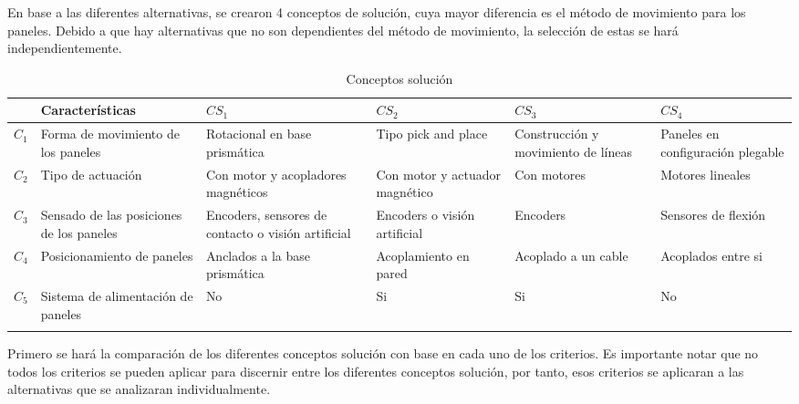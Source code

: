 \begin{center}
\begin{longtable}[!htb]
    \caption{Matriz morfológica}
    \label{tab:Matriz morfológica}
    \end{longtable}
\end{center}

En base a las diferentes alternativas, se crearon 4 conceptos de solución, cuya mayor diferencia es el método de movimiento para los paneles. Debido a que hay alternativas que no son dependientes del método de movimiento, la selección de estas se hará independientemente. 
\begin{center}
\scriptsize
\centering
    \begin{longtable}[!htb]{|>{\centering\arraybackslash}m{3em} ||>{\centering\arraybackslash}m{8em} | >{\centering\arraybackslash}m{8em}| >{\centering\arraybackslash}m{8em}| >{\centering\arraybackslash}m{8em}|>{\centering\arraybackslash}m{8em}|}
    \hline
    & \textbf{Características} & \textbf{$CS_1$} & \textbf{$CS_2$}& \textbf{$CS_3$}& \textbf{$CS_4$}\\
    \hline\hline
    \textbf{$C_1$} & Forma de movimiento de los paneles & Rotacional en base prismática & Tipo pick and place & Construcción y movimiento de líneas & Paneles en configuración plegable\\
    \hline
    \textbf{$C_2$} & Tipo de actuación & Con motor y acopladores magnéticos & Con motor y actuador magnético & Con motores & Motores lineales\\
    \hline
    \textbf{$C_3$} & Sensado de las posiciones de los paneles & Encoders, sensores de contacto o visión artificial & Encoders o visión artificial & Encoders & Sensores de flexión\\
    \hline
    \textbf{$C_4$} & Posicionamiento de paneles & Anclados a la base prismática & Acoplamiento en pared & Acoplado a un cable & Acoplados entre si\\
    \hline
    \textbf{$C_5$} & Sistema de alimentación de paneles & No & Si & Si & No \\
    \hline

    \caption{Conceptos solución}
    \label{tab:ConceptosSolucion}
    \end{longtable}
\end{center}
Primero se hará la comparación de los diferentes conceptos solución con base en cada uno de los criterios. Es importante notar que no todos los criterios se pueden aplicar para discernir entre los diferentes conceptos solución, por tanto, esos criterios se aplicaran a las alternativas que se analizaran individualmente.
